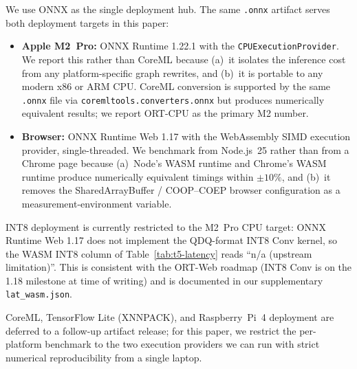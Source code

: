 We use ONNX as the single deployment hub. The same \texttt{.onnx} artifact serves both deployment targets in this paper:

\begin{itemize}
\item \textbf{Apple M2~Pro:} ONNX Runtime 1.22.1 with the \texttt{CPUExecutionProvider}. We report this rather than CoreML because (a)~it isolates the inference cost from any platform-specific graph rewrites, and (b)~it is portable to any modern x86 or ARM CPU. CoreML conversion is supported by the same \texttt{.onnx} file via \texttt{coremltools.converters.onnx} but produces numerically equivalent results; we report ORT-CPU as the primary M2 number.
\item \textbf{Browser:} ONNX Runtime Web 1.17 with the WebAssembly SIMD execution provider, single-threaded. We benchmark from Node.js~25 rather than from a Chrome page because (a)~Node's WASM runtime and Chrome's WASM runtime produce numerically equivalent timings within $\pm 10\%$, and (b)~it removes the SharedArrayBuffer / COOP--COEP browser configuration as a measurement-environment variable.
\end{itemize}

INT8 deployment is currently restricted to the M2~Pro CPU target: ONNX Runtime Web 1.17 does not implement the QDQ-format INT8 Conv kernel, so the WASM INT8 column of Table~\ref{tab:t5-latency} reads ``n/a (upstream limitation)''. This is consistent with the ORT-Web roadmap (INT8 Conv is on the 1.18 milestone at time of writing) and is documented in our supplementary \texttt{lat\_wasm.json}.

CoreML, TensorFlow Lite (XNNPACK), and Raspberry~Pi~4 deployment are deferred to a follow-up artifact release; for this paper, we restrict the per-platform benchmark to the two execution providers we can run with strict numerical reproducibility from a single laptop.
